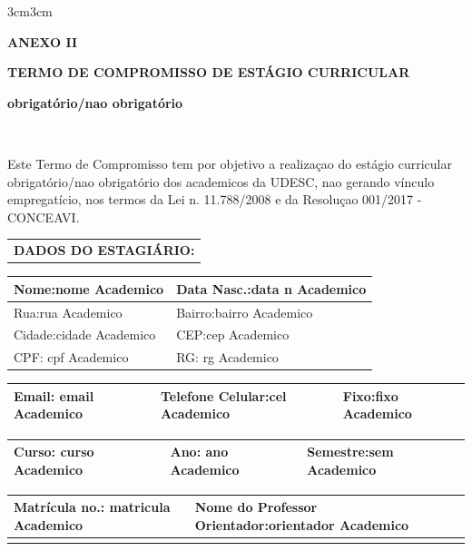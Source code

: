 \documentclass[10pt,a4paper]{article}
\begin{document}
\marginsize {2.5cm}{2.5cm}  {3cm}{3cm}
	
	

	



\begin{center}\textbf{ANEXO II}\end{center}


\begin{center}\textbf{TERMO DE COMPROMISSO DE ESTÁGIO CURRICULAR }
\end{center}

\begin{center}\textbf{obrigatório/nao obrigatório}
\end{center}
\begin{center}
\textbf	\\
\end{center}
Este Termo de Compromisso tem por objetivo a realizaçao do estágio 
curricular obrigatório/nao obrigatório dos academicos da UDESC, nao 
gerando vínculo empregatício, nos termos da Lei n. 11.788/2008 e da 
Resoluçao 001/2017 - CONCEAVI.
\\


\begin{table}[ht]
\begin{tabular*}{1\textwidth}{p{16cm}}
\textbf{DADOS DO ESTAGIÁRIO:}\\
\end{tabular*}
\centering
\begin{tabular*}{1\textwidth}{p{10cm}p{6cm}}

Nome:nome Academico & Data Nasc.:data n Academico \\
\hline
Rua:rua Academico & Bairro:bairro Academico \\
\hline
Cidade:cidade Academico &CEP:cep Academico \\
\hline
CPF: cpf Academico &RG: rg Academico \\
\hline
\end{tabular*}
\begin{tabular*}{1\textwidth}{p{6.5cm}p{6cm}p{3.5cm}}
Email: email Academico & Telefone Celular:cel Academico &Fixo:fixo Academico \\
\hline
\end{tabular*}
\begin{tabular*}{1\textwidth}{p{9cm}p{3cm}p{4cm}}
Curso: curso Academico & Ano: ano Academico &Semestre:sem Academico \\
\hline
\end{tabular*}
\begin{tabular*}{1\textwidth}{p{6cm}p{10cm}}
Matrícula no.: matricula Academico &Nome do Professor Orientador:orientador Academico \\
\hline
&\\
\end{tabular*}
\end{table}
\end{document}
